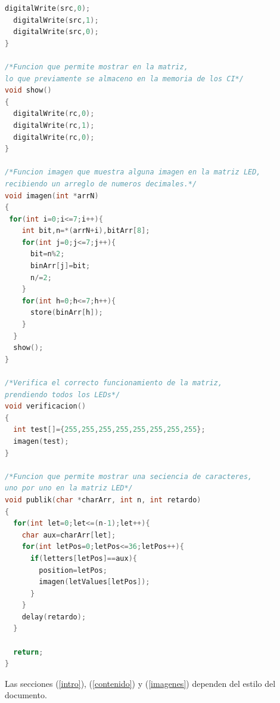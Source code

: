 \documentclass{article}
\begin{document}
\begin{lstlisting}[language=C++, label=codigo_ejemplo]
  digitalWrite(src,0);
  digitalWrite(src,1);
  digitalWrite(src,0);
}

/*Funcion que permite mostrar en la matriz,
lo que previamente se almaceno en la memoria de los CI*/
void show()
{
  digitalWrite(rc,0);
  digitalWrite(rc,1);
  digitalWrite(rc,0);
}

/*Funcion imagen que muestra alguna imagen en la matriz LED,
recibiendo un arreglo de numeros decimales.*/
void imagen(int *arrN)
{
 for(int i=0;i<=7;i++){
    int bit,n=*(arrN+i),bitArr[8];
    for(int j=0;j<=7;j++){
      bit=n%2;
      binArr[j]=bit;
      n/=2;
    }
    for(int h=0;h<=7;h++){
      store(binArr[h]);
    }
  }
  show();
}

/*Verifica el correcto funcionamiento de la matriz,
prendiendo todos los LEDs*/
void verificacion()
{
  int test[]={255,255,255,255,255,255,255,255};
  imagen(test);
}

/*Funcion que permite mostrar una seciencia de caracteres,
uno por uno en la matriz LED*/
void publik(char *charArr, int n, int retardo)
{
  for(int let=0;let<=(n-1);let++){
    char aux=charArr[let];
    for(int letPos=0;letPos<=36;letPos++){
      if(letters[letPos]==aux){
        position=letPos;
        imagen(letValues[letPos]);
      }
    }
    delay(retardo);
  }
  
  return;
}
\end{lstlisting}

Las secciones (\ref{intro}), (\ref{contenido}) y (\ref{imagenes}) dependen del estilo del documento.

\newpage
\end{document}
